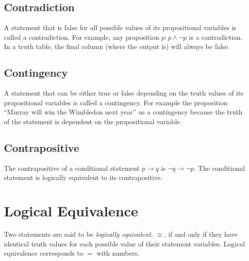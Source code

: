 \subsection{Contradiction}
A statement that is false for all possible values of its propositional variables is called a contradiction. For example, any proposition $p: p \wedge ¬p$ is a contradiction. In a truth table, the final column (where the output is) will always be false. 
\subsection{Contingency}
A statement that can be either true or false depending on the truth values of its propositional variables is called a contingency. For example the proposition ``Murray will win the Wimbledon next year'' us a contingency because the truth of the statement is dependent on the propositional variable. 
\subsection{Contrapositive}
The contrapositive of a conditional statement $p \rightarrow q$ is $¬q \rightarrow ¬p$. The conditional statement is logically equivalent to its contrapositive.

\section{Logical Equivalence}
Two statements are said to be \textit{logically equivalent}, $\equiv$, if and only if they have identical truth values for each possible value of their statement variables. Logical equivalence corresponds to $=$ with numbers.\\

